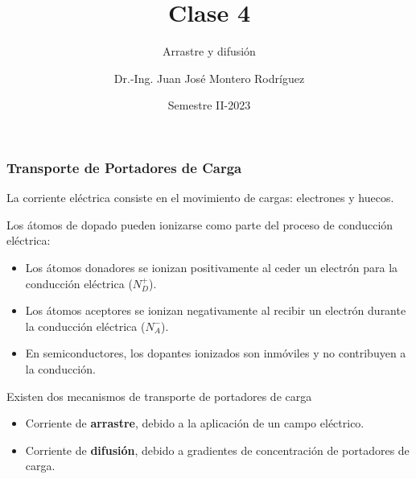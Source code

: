 \documentclass[10pt,t,aspectratio=169]{beamer}
\title{Clase 4}
\subtitle{Arrastre y difusión}
\author{Dr.-Ing. Juan José Montero Rodríguez}
\institute{Escuela de Ingeniería Electrónica}
\date{Semestre II-2023}
\begin{document}
\begin{frame}[t]
\titlepage
\end{frame}


\begin{frame}[t]
    \frametitle{Transporte de Portadores de Carga}

    La corriente eléctrica consiste en el movimiento de cargas: electrones y huecos.

    \vspace{3mm}
    Los átomos de dopado pueden ionizarse como parte del proceso de conducción eléctrica:

    \begin{itemize}
        \item Los átomos donadores se ionizan positivamente al ceder un electrón para la conducción eléctrica ($N_D^+$).
        \item Los átomos aceptores se ionizan negativamente al recibir un electrón durante la conducción eléctrica ($N_A^-$).
        \item En semiconductores, los dopantes ionizados son inmóviles y no contribuyen a la conducción.
        
    \end{itemize}

    \vspace{3mm}
    Existen dos mecanismos de transporte de portadores de carga

    \begin{itemize}
        \item Corriente de \textbf{arrastre}, debido a la aplicación de un campo eléctrico.
        \item Corriente de \textbf{difusión}, debido a gradientes de concentración de portadores de carga.
    \end{itemize}
\end{frame}
\end{document}

